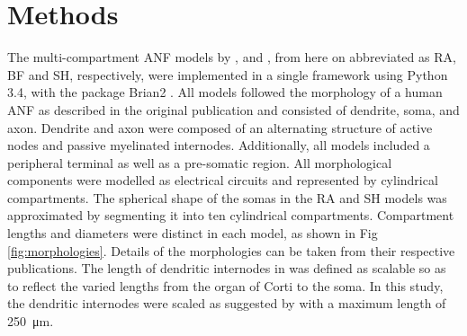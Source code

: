 \documentclass[utf8]{frontiersSCNS} %
\begin{document}
\section{Methods}
\label{sec:methods}
The multi-compartment ANF models by \cite{Rattay2001}, \cite{Briaire2005} and \cite{Smit2010}, from here on abbreviated as RA, BF and SH, respectively, were implemented in a single framework using Python 3.4, with the package Brian2 \citep{Goodman2009}. All models followed the morphology of a human ANF as described in the original publication and consisted of dendrite, soma, and axon. Dendrite and axon were composed of an alternating structure of active nodes and passive myelinated internodes. Additionally, all models included a peripheral terminal as well as a pre-somatic region. All morphological components were modelled as electrical circuits and represented by cylindrical compartments. The spherical shape of the somas in the RA and SH models was approximated by segmenting it into ten cylindrical compartments. Compartment lengths and diameters were distinct in each model, as shown in Fig \ref{fig:morphologies}. Details of the morphologies can be taken from their respective publications. The length of dendritic internodes in \cite{Briaire2005} was defined as scalable so as to reflect the varied lengths from the organ of Corti to the soma. In this study, the dendritic internodes were scaled as suggested by \cite{Kalkman2014a} with a maximum length of \SI{250}{\micro\meter}.
\end{document}
